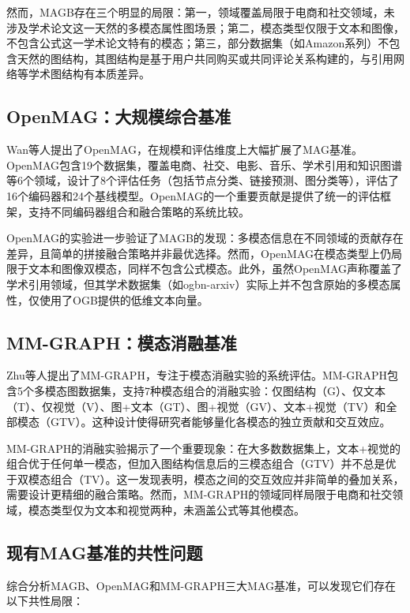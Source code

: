 然而，MAGB存在三个明显的局限：第一，领域覆盖局限于电商和社交领域，未涉及学术论文这一天然的多模态属性图场景；第二，模态类型仅限于文本和图像，不包含公式这一学术论文特有的模态；第三，部分数据集（如Amazon系列）不包含天然的图结构，其图结构是基于用户共同购买或共同评论关系构建的，与引用网络等学术图结构有本质差异。

\subsection{OpenMAG：大规模综合基准}

Wan等人\cite{wan2026openmag}提出了OpenMAG，在规模和评估维度上大幅扩展了MAG基准。OpenMAG包含19个数据集，覆盖电商、社交、电影、音乐、学术引用和知识图谱等6个领域，设计了8个评估任务（包括节点分类、链接预测、图分类等），评估了16个编码器和24个基线模型。OpenMAG的一个重要贡献是提供了统一的评估框架，支持不同编码器组合和融合策略的系统比较。

OpenMAG的实验进一步验证了MAGB的发现：多模态信息在不同领域的贡献存在差异，且简单的拼接融合策略并非最优选择。然而，OpenMAG在模态类型上仍局限于文本和图像双模态，同样不包含公式模态。此外，虽然OpenMAG声称覆盖了学术引用领域，但其学术数据集（如ogbn-arxiv）实际上并不包含原始的多模态属性，仅使用了OGB提供的低维文本向量。

\subsection{MM-GRAPH：模态消融基准}

Zhu等人\cite{zhu2025mmgraph}提出了MM-GRAPH，专注于模态消融实验的系统评估。MM-GRAPH包含5个多模态图数据集，支持7种模态组合的消融实验：仅图结构（G）、仅文本（T）、仅视觉（V）、图+文本（GT）、图+视觉（GV）、文本+视觉（TV）和全部模态（GTV）。这种设计使得研究者能够量化各模态的独立贡献和交互效应。

MM-GRAPH的消融实验揭示了一个重要现象：在大多数数据集上，文本+视觉的组合优于任何单一模态，但加入图结构信息后的三模态组合（GTV）并不总是优于双模态组合（TV）。这一发现表明，模态之间的交互效应并非简单的叠加关系，需要设计更精细的融合策略。然而，MM-GRAPH的领域同样局限于电商和社交领域，模态类型仅为文本和视觉两种，未涵盖公式等其他模态。

\subsection{现有MAG基准的共性问题}

综合分析MAGB\cite{yan2025magb}、OpenMAG\cite{wan2026openmag}和MM-GRAPH\cite{zhu2025mmgraph}三大MAG基准，可以发现它们存在以下共性局限：


